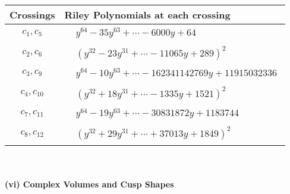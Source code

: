 \documentclass[1p]{elsarticle_modified}
\theoremstyle{definition}
\begin{document}
\begin{tabular}{m{50pt}|m{274pt}}
Crossings & \hspace{64pt}Riley Polynomials at each crossing \\
\hline $$\begin{aligned}c_{1},c_{5}\end{aligned}$$&$\begin{aligned}
&y^{64}-35 y^{63}+\cdots-6000 y+64
\end{aligned}$\\
\hline $$\begin{aligned}c_{2},c_{6}\end{aligned}$$&$\begin{aligned}
&(y^{32}-23 y^{31}+\cdots-11065 y+289)^{2}
\end{aligned}$\\
\hline $$\begin{aligned}c_{3},c_{9}\end{aligned}$$&$\begin{aligned}
&y^{64}-10 y^{63}+\cdots-162341142769 y+11915032336
\end{aligned}$\\
\hline $$\begin{aligned}c_{4},c_{10}\end{aligned}$$&$\begin{aligned}
&(y^{32}+18 y^{31}+\cdots-1335 y+1521)^{2}
\end{aligned}$\\
\hline $$\begin{aligned}c_{7},c_{11}\end{aligned}$$&$\begin{aligned}
&y^{64}-19 y^{63}+\cdots-30831872 y+1183744
\end{aligned}$\\
\hline $$\begin{aligned}c_{8},c_{12}\end{aligned}$$&$\begin{aligned}
&(y^{32}+29 y^{31}+\cdots+37013 y+1849)^{2}
\end{aligned}$\\
\hline
\end{tabular}\\~\\
\newpage\flushleft \textbf{(vi) Complex Volumes and Cusp Shapes}
\end{document}
